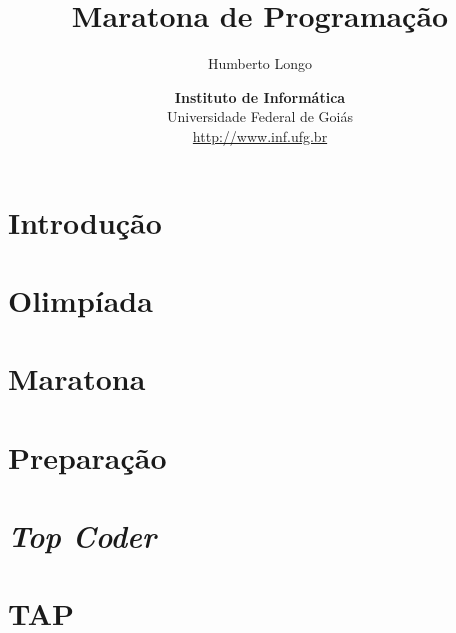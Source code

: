 \documentclass{beamer}
\title[\bf Instituto\\ de\\ Informática\\ \large{UFG}]{{\bf\huge Maratona de Programação}}
\date{{\bf Instituto de Informática}\\ Universidade Federal de Goiás\\ \small{\url{ http://www.inf.ufg.br}}}
\author[]{Humberto Longo}
\begin{document}
\begin{frame}
 \begin{block}{}
  \titlepage
 \end{block}
\end{frame}

\section{Introdução}
 

\section{Olimpíada}
 

\section{Maratona}
 

\section{Preparação}
 

\section{\em Top Coder}
 

\section{TAP}
 

\begin{frame}
 \begin{block}{}
  \titlepage
 \end{block}
\end{frame}
\end{document}
